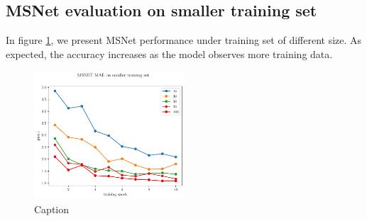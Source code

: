 \documentclass[runningheads]{llncs}
\begin{document}
\subsection{MSNet evaluation on smaller training set}

In figure \ref{fig:msnet_smaller_tr_set}, we present MSNet performance under training set of different size. As expected, the accuracy increases as the model observes more training data.

\begin{figure}[t]
    \centering
    \includegraphics[width=0.5\textwidth]{figures/freiburg_msnet_mae_smaller_training_set.pdf}
    \caption{Caption}
    \label{fig:msnet_smaller_tr_set}
\end{figure}



\end{document}
